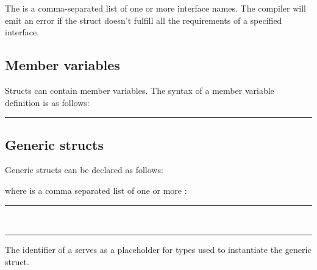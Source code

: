 \begin{grammar}
  \code{:}  \code{\{}  \code{\}}
\end{grammar}

The  is a comma-separated list of one or more
interface names. The compiler will emit an error if the struct doesn't fulfill
all the requirements of a specified interface.

\subsection{Member variables}

Structs can contain member variables. The syntax of a member variable definition
is as follows:

\begin{grammar}
\rule{member-variable-declaration}   \code{;}
\end{grammar}

\subsection{Generic structs}

Generic structs can be declared as follows:

\begin{grammar}
  \code{<}  \code{>} \code{\{}  \code{\}}
\end{grammar}

where  is a comma separated list of one or
more :

\begin{grammar}
\rule{generic-parameter} \\
\rule{generic-type-parameter} 
\end{grammar}

The identifier of a  serves as a placeholder
for types used to instantiate the generic struct.
